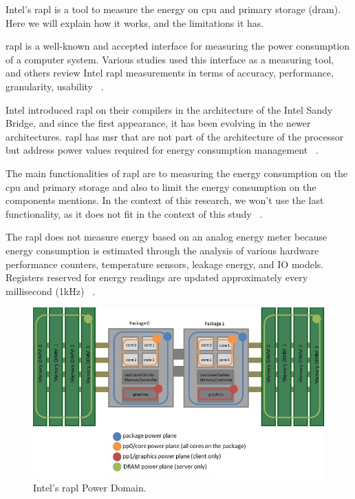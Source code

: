    Intel’s \gls{rapl} is a tool to measure the energy on \gls{cpu} and primary storage (\gls{dram}). Here we will explain how it works, and the limitations it has.
	
	\gls{rapl} is a well-known and accepted interface for measuring the power consumption of a computer system. Various studies used this interface as a measuring tool, and others review Intel \gls{rapl} measurements in terms of accuracy, performance, granularity, usability ~\cite{raplpref,raplpref2}.
	

	Intel introduced \gls{rapl} on their   compilers in the architecture of the Intel Sandy Bridge, and since the first appearance, it has been evolving in the newer architectures. \gls{rapl} has \gls{msr} that are not part of the architecture of the processor but address power values required for energy consumption management ~\cite{raplpref,intel64and,portela2016}.
	
	
    The main functionalities of \gls{rapl} are to measuring the energy consumption on the \gls{cpu} and primary storage and also to limit the energy consumption on the components mentions. In the context of this research, we won't use the last functionality, as it does not fit in the context of this study ~\cite{raplpref,raplpref2,intel64and}.
	
	
	The \gls{rapl} does not measure energy based on an analog energy meter because energy consumption is estimated through the analysis of various hardware performance counters, temperature sensors, leakage energy, and IO models.  Registers reserved for energy readings are updated approximately every millisecond (1kHz) ~\cite{energypapi,portela2016}.

    \begin{figure}[ht!]
    \centering
    \includegraphics[width=0.8\columnwidth]{Chapters/images/power_domains2.jpg}  \caption{Intel’s \gls{rapl} Power Domain.}
    \label{fig:powerdomain}
    \end{figure}
    
